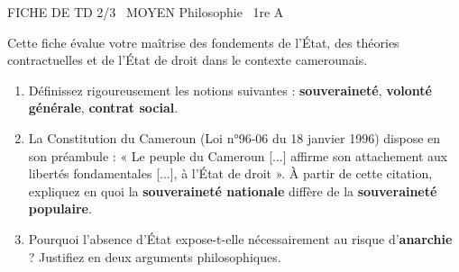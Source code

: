 \documentclass[11pt]{article}
\begin{document}
\begin{tcolorbox}[enhanced,colback=popink,colframe=popink,arc=10pt,boxrule=0pt,left=12pt,right=12pt,top=9pt,bottom=9pt]
{\color{white}\popxbold\small FICHE DE TD 2/3 \textbullet\ MOYEN \hfill Philosophie \textbullet\ 1re A\par}
\end{tcolorbox}
\vspace{4pt}
Cette fiche évalue votre maîtrise des fondements de l'État, des théories contractuelles et de l'État de droit dans le contexte camerounais.

\begin{exercice}
\begin{enumerate}
    \item Définissez rigoureusement les notions suivantes : \textbf{souveraineté}, \textbf{volonté générale}, \textbf{contrat social}.
    \item La Constitution du Cameroun (Loi n°96-06 du 18 janvier 1996) dispose en son préambule : « Le peuple du Cameroun [...] affirme son attachement aux libertés fondamentales [...], à l'État de droit ». À partir de cette citation, expliquez en quoi la \textbf{souveraineté nationale} diffère de la \textbf{souveraineté populaire}.
    \item Pourquoi l'absence d'État expose-t-elle nécessairement au risque d'\textbf{anarchie} ? Justifiez en deux arguments philosophiques.
\end{enumerate}
\end{exercice}
\end{document}
